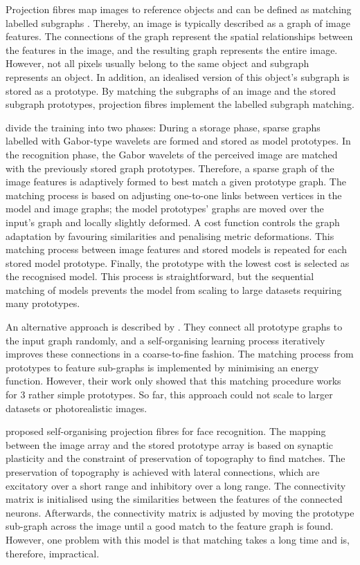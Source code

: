 Projection fibres map images to reference objects and can be defined as matching labelled subgraphs .
Thereby, an image is typically described as a graph of image features. The connections of the graph represent the spatial relationships between the features in the image, and the resulting graph represents the entire image. However, not all pixels usually belong to the same object and subgraph represents an object.
In addition, an idealised version of this object's subgraph is stored as a prototype.
By matching the subgraphs of an image and the stored subgraph prototypes, projection fibres implement the labelled subgraph matching.

 divide the training into two phases: During a storage phase, sparse graphs labelled with Gabor-type wavelets are formed and stored as model prototypes. In the recognition phase, the Gabor wavelets of the perceived image are matched with the previously stored graph prototypes.
Therefore, a sparse graph of the image features is adaptively formed to best match a given prototype graph. The matching process is based on adjusting one-to-one links between vertices in the model and image graphs; the model prototypes' graphs are moved over the input's graph and locally slightly deformed. A cost function controls the graph adaptation by favouring similarities and penalising metric deformations. This matching process between image features and stored models is repeated for each stored model prototype. Finally, the prototype with the lowest cost is selected as the recognised model. This process is straightforward, but the sequential matching of models prevents the model from scaling to large datasets requiring many prototypes.

An alternative approach is described by . They connect all prototype graphs to the input graph randomly, and a self-organising learning process iteratively improves these connections in a coarse-to-fine fashion.
The matching process from prototypes to feature sub-graphs is implemented by minimising an energy function.
However, their work only showed that this matching procedure works for $3$ rather simple prototypes.
So far, this approach could not scale to larger datasets or photorealistic images.

 proposed self-organising projection fibres for face recognition. The mapping between the image array and the stored prototype array is based on synaptic plasticity and the constraint of preservation of topography to find matches. The preservation of topography is achieved with lateral connections, which are excitatory over a short range and inhibitory over a long range.
The connectivity matrix is initialised using the similarities between the features of the connected neurons. Afterwards, the connectivity matrix is adjusted by moving the prototype sub-graph across the image until a good match to the feature graph is found.
However, one problem with this model is that matching takes a long time and is, therefore, impractical.

